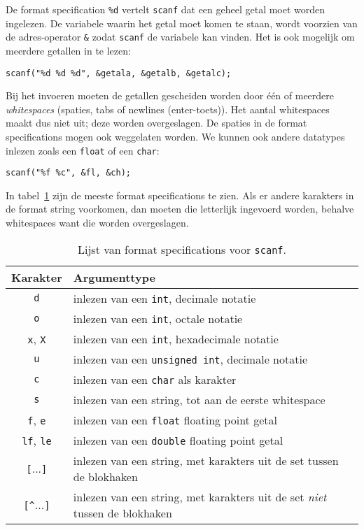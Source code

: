 De format specification \texttt{\%d} vertelt \texttt{scanf} dat een geheel getal moet worden ingelezen. De variabele waarin het getal moet komen te staan, wordt voorzien van de adres-operator \texttt{\&} zodat \texttt{scanf} de variabele kan vinden. Het is ook mogelijk om meerdere getallen in te lezen:

\begin{lstlisting}[style=lstoneline]
scanf("%d %d %d", &getala, &getalb, &getalc);
\end{lstlisting}

Bij het invoeren moeten de getallen gescheiden worden door één of meerdere \textsl{whitespaces} (spaties, tabs of newlines (enter-toets)). Het aantal whitespaces maakt dus niet uit; deze worden overgeslagen. De spaties in de format specifications mogen ook weggelaten worden. We kunnen ook andere datatypes inlezen zoals een \texttt{float} of een \texttt{char}:

\begin{lstlisting}[style=lstoneline]
scanf("%f %c", &fl, &ch);
\end{lstlisting}

In tabel~\ref{tab:invscanf} zijn de meeste format specifications te zien. Als er andere karakters in de format string voorkomen, dan moeten die letterlijk ingevoerd worden, behalve whitespaces want die worden overgeslagen.

\begin{table}[!ht]
\centering
\caption{Lijst van format specifications voor \texttt{scanf}.}
\label{tab:invscanf}
\begin{tabular}{cl}
\toprule
Karakter & Argumenttype \\
\midrule 
\texttt{d} & inlezen van een \texttt{int}, decimale notatie\\
\texttt{o} & inlezen van een \texttt{int}, octale notatie\\
\texttt{x}, \texttt{X} & inlezen van een \texttt{int}, hexadecimale notatie\\
\texttt{u} & inlezen van een \texttt{unsigned int}, decimale notatie\\
\texttt{c} & inlezen van een \texttt{char} als karakter\\
\texttt{s} & inlezen van een string, tot aan de eerste whitespace\\
\texttt{f}, \texttt{e} & inlezen van een \texttt{float} floating point getal\\
\texttt{lf}, \texttt{le} & inlezen van een \texttt{double} floating point getal\\
\texttt{[}...\texttt{]} & inlezen van een string, met karakters uit de set tussen de blokhaken\\
\texttt{[\textasciicircum}...\texttt{]} & inlezen van een string, met karakters uit de set \textsl{niet} tussen de blokhaken\\
\bottomrule
\end{tabular}
\end{table}

